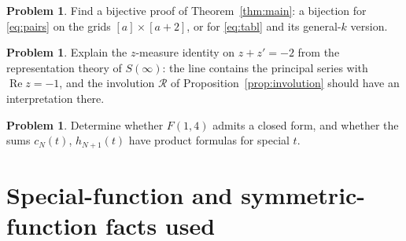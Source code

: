 \documentclass[11pt]{article}
\theoremstyle{definition}
\newtheorem{problem}[theorem]{Problem}
\theoremstyle{remark}
\begin{document}
\begin{problem}
Find a bijective proof of Theorem~\ref{thm:main}: a bijection for \eqref{eq:pairs} on the grids $[a]\times[a+2]$, or for \eqref{eq:tabl} and its general-$k$ version.
\end{problem}

\begin{problem}
Explain the $z$-measure identity on $z+z'=-2$ from the representation theory of $S(\infty)$: the line contains the principal series with $\operatorname{Re}z=-1$, and the involution $\mathcal R$ of Proposition~\ref{prop:involution} should have an interpretation there.
\end{problem}

\begin{problem}
Determine whether $F(1,4)$ admits a closed form, and whether the sums $c_N(t)$, $h_{N+1}(t)$ have product formulas for special $t$.
\end{problem}

\appendix

\section{Special-function and symmetric-function facts used}\label{app:hyper}
\end{document}
